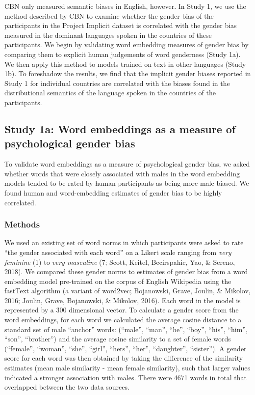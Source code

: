 \documentclass[man,floatsintext]{apa6}
\theoremstyle{definition}
\theoremstyle{definition}
\theoremstyle{definition}
\theoremstyle{remark}
\begin{document}
CBN only measured semantic biases in English, however. In Study 1, we
use the method described by CBN to examine whether the gender bias of
the participants in the Project Implicit dataset is correlated with the
gender bias measured in the dominant languages spoken in the countries
of these participants. We begin by validating word embedding measures of
gender bias by comparing them to explicit human judgements of word
genderness (Study 1a). We then apply this method to models trained on
text in other languages (Study 1b). To foreshadow the results, we find
that the implicit gender biases reported in Study 1 for individual
countries are correlated with the biases found in the distributional
semantics of the language spoken in the countries of the participants.

\subsection{Study 1a: Word embeddings as a measure of psychological
gender
bias}\label{study-1a-word-embeddings-as-a-measure-of-psychological-gender-bias}

To validate word embeddings as a measure of psychological gender bias,
we asked whether words that were closely associated with males in the
word embedding models tended to be rated by human participants as being
more male biased. We found human and word-embedding estimates of gender
bias to be highly correlated.

\subsubsection{Methods}\label{methods}

We used an existing set of word norms in which participants were asked
to rate \enquote{the gender associated with each word} on a Likert scale
ranging from \emph{very feminine} (1) to \emph{very masculine} (7;
Scott, Keitel, Becirspahic, Yao, \& Sereno, 2018). We compared these
gender norms to estimates of gender bias from a word embedding model
pre-trained on the corpus of English Wikipedia using the fastText
algorithm (a variant of word2vec; Bojanowski, Grave, Joulin, \& Mikolov,
2016; Joulin, Grave, Bojanowski, \& Mikolov, 2016). Each word in the
model is represented by a 300 dimensional vector. To calculate a gender
score from the word embeddings, for each word we calculated the average
cosine distance to a standard set of male \enquote{anchor} words:
(\enquote{male}, \enquote{man}, \enquote{he}, \enquote{boy},
\enquote{his}, \enquote{him}, \enquote{son}, \enquote{brother}) and the
average cosine similarity to a set of female words (\enquote{female},
\enquote{woman}, \enquote{she}, \enquote{girl}, \enquote{hers},
\enquote{her}, \enquote{daughter}, \enquote{sister}). A gender score for
each word was then obtained by taking the difference of the similarity
estimates (mean male similarity - mean female similarity), such that
larger values indicated a stronger association with males. There were
4671 words in total that overlapped between the two data sources.
\end{document}
